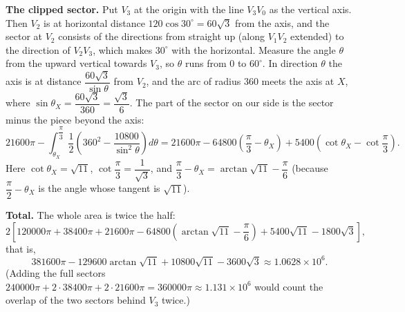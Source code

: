 \textbf{The clipped sector.} Put $V_3$ at the origin with the line $V_3V_0$ as the vertical axis. Then $V_2$ is at horizontal distance $120\cos30^\circ=60\sqrt3$ from the axis, and the sector at $V_2$ consists of the directions from straight up (along $V_1V_2$ extended) to the direction of $V_2V_3$, which makes $30^\circ$ with the horizontal. Measure the angle $\theta$ from the upward vertical towards $V_3$, so $\theta$ runs from $0$ to $60^\circ$. In direction $\theta$ the axis is at distance $\dfrac{60\sqrt3}{\sin\theta}$ from $V_2$, and the arc of radius $360$ meets the axis at $X$, where $\sin\theta_X=\dfrac{60\sqrt3}{360}=\dfrac{\sqrt3}{6}$. The part of the sector on our side is the sector minus the piece beyond the axis:
\[
21600\pi-\int_{\theta_X}^{\dfrac{\pi}{3}}\dfrac{1}{2}\left(360^2-\dfrac{10800}{\sin^2\theta}\right)d\theta
=21600\pi-64800\left(\dfrac{\pi}{3}-\theta_X\right)+5400\left(\cot\theta_X-\cot\dfrac{\pi}{3}\right).
\]
Here $\cot\theta_X=\sqrt{11}$, $\cot\dfrac{\pi}{3}=\dfrac{1}{\sqrt3}$, and $\dfrac{\pi}{3}-\theta_X=\arctan\sqrt{11}-\dfrac{\pi}{6}$ (because $\dfrac{\pi}{2}-\theta_X$ is the angle whose tangent is $\sqrt{11}$).

\textbf{Total.} The whole area is twice the half:
\[
2\left[120000\pi+38400\pi+21600\pi-64800\left(\arctan\sqrt{11}-\dfrac{\pi}{6}\right)+5400\sqrt{11}-1800\sqrt3\right],
\]
that is,
\[
\boxed{381600\pi-129600\arctan\sqrt{11}+10800\sqrt{11}-3600\sqrt3}\approx1.0628\times10^{6}.
\]
(Adding the full sectors $240000\pi+2\cdot38400\pi+2\cdot21600\pi=360000\pi\approx1.131\times10^6$ would count the overlap of the two sectors behind $V_3$ twice.)
